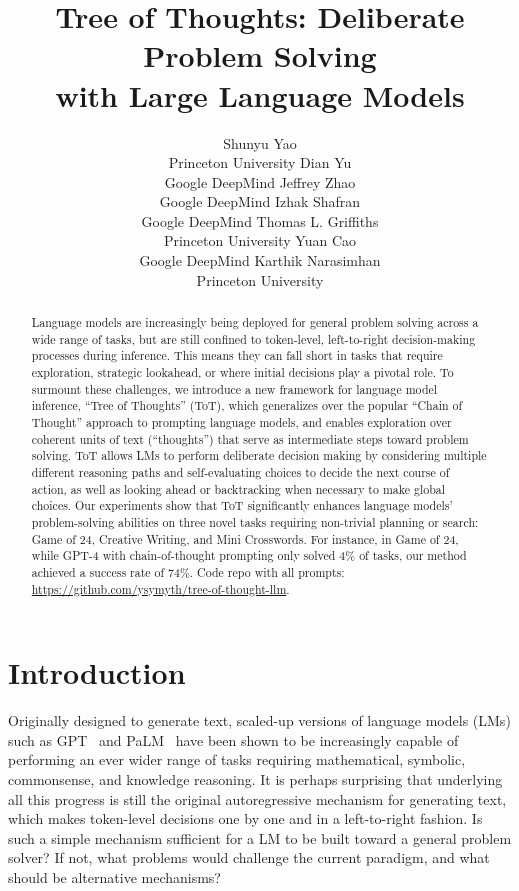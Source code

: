 \documentclass{article}
\title{Tree of Thoughts: Deliberate Problem Solving \\ with Large Language Models}
\author{%
  Shunyu Yao
    \\
  Princeton University
  \And Dian Yu \\ Google DeepMind
  \And Jeffrey Zhao \\ Google DeepMind
  \And Izhak Shafran \\ Google DeepMind
  \And Thomas L. Griffiths \\ Princeton University
  \And Yuan Cao \\ Google DeepMind
  \And Karthik Narasimhan \\ Princeton University
}
\begin{document}
\maketitle


\begin{abstract}
Language models are increasingly being deployed for general problem solving across a wide range of tasks, but are still confined to token-level, left-to-right decision-making processes during inference. This means they can fall short in tasks that require exploration, strategic lookahead, or where initial decisions play a pivotal role. 
To surmount these challenges, we introduce a new framework for language model inference, ``Tree of Thoughts'' (ToT), which generalizes over the popular ``Chain of Thought'' approach to prompting language models, and enables exploration over coherent units of text (``thoughts'') that serve as intermediate steps toward problem solving.
ToT allows LMs to perform deliberate decision making by considering multiple different reasoning paths and self-evaluating choices to decide the next course of action, as well as looking ahead or backtracking when necessary to make global choices.
Our experiments show that ToT significantly enhances language models’ problem-solving abilities on three novel tasks requiring non-trivial planning or search: Game of 24, Creative Writing, and Mini Crosswords. 
For instance, in Game of 24, while GPT-4 with chain-of-thought prompting only solved 4\% of tasks, our method achieved a success rate of 74\%.  Code repo with all prompts: \url{https://github.com/ysymyth/tree-of-thought-llm}.

\end{abstract}


\section{Introduction}
Originally designed to generate text, scaled-up versions of language models (LMs) such as GPT~\cite{Radford2018ImprovingLU,Radford2019LanguageMA,brown2020language,OpenAI2023GPT4TR} and PaLM~\cite{chowdhery2022palm} have been shown to be increasingly capable of performing an ever wider range of tasks %
requiring mathematical, symbolic, commonsense, and knowledge reasoning. It is perhaps surprising that underlying all this progress is still the original autoregressive mechanism for generating text, which makes token-level decisions one by one and in a left-to-right fashion.
Is such a simple mechanism sufficient for a LM to be built toward a general problem solver? 
If not, what problems would challenge the current paradigm, and what should be alternative mechanisms? 
\end{document}
